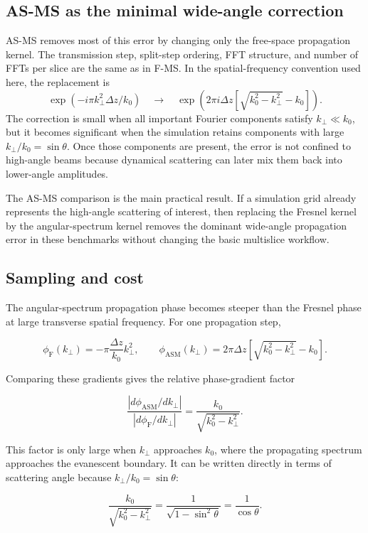 \documentclass[preprint,12pt,number]{elsarticle}
\begin{document}
\subsection{AS-MS as the minimal wide-angle correction}

AS-MS removes most of this error by changing only the free-space propagation
kernel. The transmission step, split-step ordering, FFT structure, and number
of FFTs per slice are the same as in F-MS. In the spatial-frequency
convention used here, the replacement is
\[
\exp(-i\pi k_\perp^2 \Delta z/k_0)
\quad\rightarrow\quad
\exp\left(2\pi i\Delta z[\sqrt{k_0^2-k_\perp^2}-k_0]\right).
\]
The correction is small when all important Fourier components satisfy
$k_\perp\ll k_0$, but it becomes significant when the simulation retains
components with large $k_\perp/k_0=\sin\theta$. Once those components are
present, the error is not confined to high-angle beams because dynamical
scattering can later mix them back into lower-angle amplitudes.

The AS-MS comparison is the main practical result. If a simulation grid
already represents the high-angle scattering of interest, then replacing the
Fresnel kernel by the angular-spectrum kernel removes the dominant wide-angle
propagation error in these benchmarks without changing the basic multislice
workflow. 

\subsection{Sampling and cost}

The angular-spectrum propagation phase becomes steeper than the Fresnel phase
at large transverse spatial frequency. For one propagation step,

\[
\phi_{\mathrm{F}}(k_\perp) = -\pi\frac{\Delta z}{k_0}k_\perp^2,
\qquad
\phi_{\mathrm{ASM}}(k_\perp) =
2\pi\Delta z\left[\sqrt{k_0^2-k_\perp^2}-k_0\right].
\]

Comparing these gradients gives the relative phase-gradient factor

\[
\frac{\left|d\phi_{\mathrm{ASM}}/dk_\perp\right|}
{\left|d\phi_{\mathrm{F}}/dk_\perp\right|}
=
\frac{k_0}{\sqrt{k_0^2-k_\perp^2}}.
\]

This factor is only large when $k_\perp$ approaches $k_0$, where the
propagating spectrum approaches the evanescent boundary. It can be written
directly in terms of scattering angle because $k_\perp/k_0=\sin\theta$:

\[
\frac{k_0}{\sqrt{k_0^2-k_\perp^2}}
= \frac{1}{\sqrt{1-\sin^2\theta}}
= \frac{1}{\cos\theta}.
\]
\end{document}
